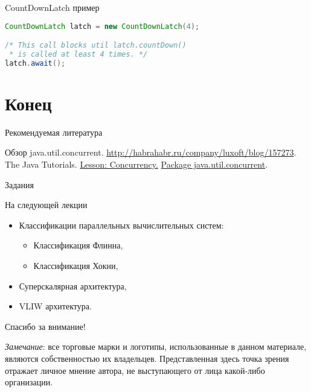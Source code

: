 \begin{frame}[fragile]{CountDownLatch пример}
\begin{lstlisting}[language=Java]
CountDownLatch latch = new CountDownLatch(4);

/* This call blocks util latch.countDown()
 * is called at least 4 times. */
latch.await();
\end{lstlisting}
\end{frame}

\section*{Конец}

\begin{frame}[allowframebreaks]{Рекомендуемая литература}
\begin{thebibliography}{99}
    \bibitem{} Обзор java.util.concurrent.
    \url{http://habrahabr.ru/company/luxoft/blog/157273}.
    \bibitem{} The Java Tutorials.
    \href{http://docs.oracle.com/javase/tutorial/essential/concurrency/index.html}{Lesson: Concurrency.}
    \bibitem{} \href{http://docs.oracle.com/javase/7/docs/api/java/util/concurrent/package-summary.html}{Package java.util.concurrent}.
\end{thebibliography}
\end{frame}

\begin{frame}{Задания}
\end{frame}

\begin{frame}{На следующей лекции}
\begin{itemize}
    \item Классификации параллельных вычислительных систем:
    \begin{itemize}
        \item Классификация Флинна,
        \item Классификация Хокни,
    \end{itemize}
    \item Суперскалярная архитектура,
    \item VLIW архитектура.
\end{itemize}
\end{frame}

\begin{frame}

{\huge{Спасибо за внимание!}\par}

\vfill

\tiny{\textit{Замечание}: все торговые марки и логотипы, использованные в данном материале, являются собственностью их владельцев. Представленная здесь точка зрения отражает личное мнение автора, не выступающего от лица какой-либо организации.}

\end{frame}


